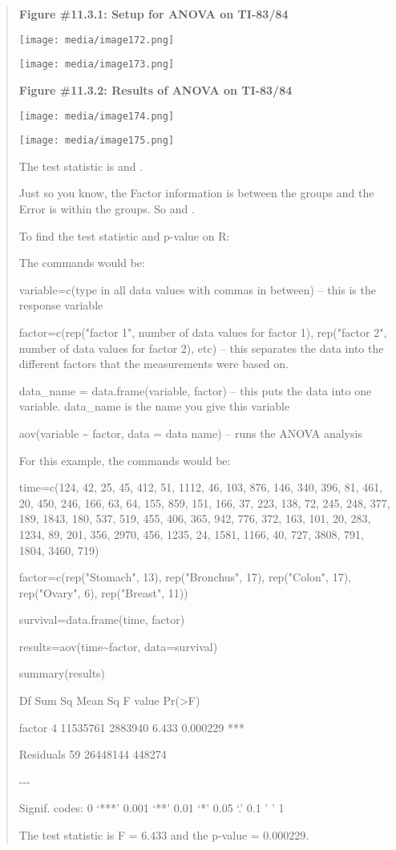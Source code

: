 \documentclass[]{book}
\begin{document}
\begin{quote}
\textbf{Figure \#11.3.1: Setup for ANOVA on TI-83/84}

\texttt{[image: media/image172.png]}

\texttt{[image: media/image173.png]}

\textbf{Figure \#11.3.2: Results of ANOVA on TI-83/84}

\texttt{[image: media/image174.png]}

\texttt{[image: media/image175.png]}

The test statistic is and .

Just so you know, the Factor information is between the groups and the Error is within the groups. So and .

To find the test statistic and p-value on R:

The commands would be:

variable=c(type in all data values with commas in between) -- this is the response variable

factor=c(rep("factor 1", number of data values for factor 1), rep("factor 2", number of data values for factor 2), etc) -- this separates the data into the different factors that the measurements were based on.

data\_name = data.frame(variable, factor) -- this puts the data into one variable. data\_name is the name you give this variable

aov(variable \textasciitilde{} factor, data = data name) -- runs the ANOVA analysis

For this example, the commands would be:

time=c(124, 42, 25, 45, 412, 51, 1112, 46, 103, 876, 146, 340, 396,
81, 461, 20, 450, 246, 166, 63, 64, 155, 859, 151, 166, 37, 223, 138,
72, 245, 248, 377, 189, 1843, 180, 537, 519, 455, 406, 365, 942, 776,
372, 163, 101, 20, 283, 1234, 89, 201, 356, 2970, 456, 1235, 24, 1581,
1166, 40, 727, 3808, 791, 1804, 3460, 719)

factor=c(rep("Stomach", 13), rep("Bronchus", 17), rep("Colon",
17), rep("Ovary", 6), rep("Breast", 11))

survival=data.frame(time, factor)

results=aov(time\textasciitilde{}factor, data=survival)

summary(results)

Df Sum Sq Mean Sq F value Pr(\textgreater{}F)

factor 4 11535761 2883940 6.433 0.000229 ***

Residuals 59 26448144 448274

-\/-\/-

Signif. codes: 0 `***' 0.001 `**' 0.01 `*' 0.05 `.' 0.1 ' ' 1

The test statistic is F = 6.433 and the p-value = 0.000229.
\end{quote}
\end{document}
